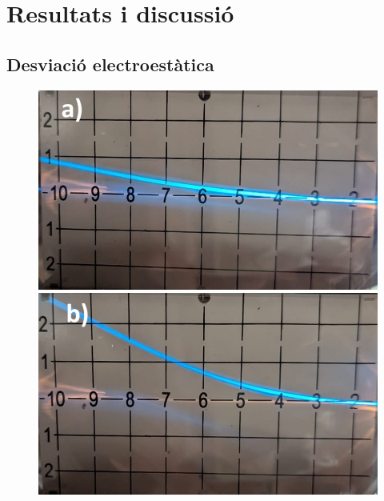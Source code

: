 \documentclass[11pt]{article}
\begin{document}
\newpage
\section{Resultats i discussió}

\subsection{Desviació electroestàtica}\label{sec: desv_electr}

\begin{figure}[h]
    \centering
    \begin{minipage}{0.38\textwidth}
        \centering
        \includegraphics[width=\textwidth]{1kV.jpg}
    \end{minipage}
    \begin{minipage}{0.38\textwidth}
        \centering
        \includegraphics[width=\textwidth]{2kV.jpg}
    \end{minipage}
    \begin{minipage}{0.38\textwidth}
        \centering

\end{minipage}
\end{figure}
\end{document}

